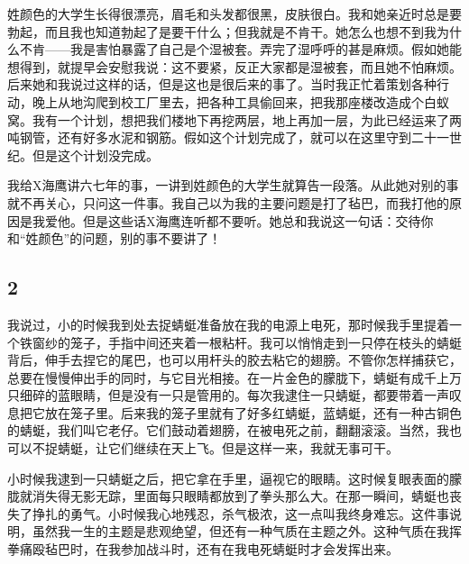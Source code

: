 姓颜色的大学生长得很漂亮，眉毛和头发都很黑，皮肤很白。我和她亲近时总是要勃起，而且我也知道勃起了是要干什么；但我就是不肯干。她怎么也想不到我为什么不肯——我是害怕暴露了自己是个湿被套。弄完了湿呼呼的甚是麻烦。假如她能想得到，就提早会安慰我说：这不要紧，反正大家都是湿被套，而且她不怕麻烦。后来她和我说过这样的话，但是这也是很后来的事了。当时我正忙着策划各种行动，晚上从地沟爬到校工厂里去，把各种工具偷回来，把我那座楼改造成个白蚁窝。我有一个计划，想把我们楼地下再挖两层，地上再加一层，为此已经运来了两吨钢管，还有好多水泥和钢筋。假如这个计划完成了，就可以在这里守到二十一世纪。但是这个计划没完成。 

我给X海鹰讲六七年的事，一讲到姓颜色的大学生就算告一段落。从此她对别的事就不再关心，只问这一件事。我自己以为我的主要问题是打了毡巴，而我打他的原因是我爱他。但是这些话X海鹰连听都不要听。她总和我说这一句话：交待你和“姓颜色”的问题，别的事不要讲了！ 

\subsection{2} 

我说过，小的时候我到处去捉蜻蜓准备放在我的电源上电死，那时候我手里提着一个铁窗纱的笼子，手指中间还夹着一根粘杆。我可以悄悄走到一只停在枝头的蜻蜓背后，伸手去捏它的尾巴，也可以用杆头的胶去粘它的翅膀。不管你怎样捕获它，总要在慢慢伸出手的同时，与它目光相接。在一片金色的朦胧下，蜻蜓有成千上万只细碎的蓝眼睛，但是没有一只是管用的。每次我逮住一只蜻蜓，都要带着一声叹息把它放在笼子里。后来我的笼子里就有了好多红蜻蜓，蓝蜻蜓，还有一种古铜色的蜻蜓，我们叫它老仔。它们鼓动着翅膀，在被电死之前，翻翻滚滚。当然，我也可以不捉蜻蜓，让它们继续在天上飞。但是这样一来，我就无事可干。 

小时候我逮到一只蜻蜓之后，把它拿在手里，逼视它的眼睛。这时候复眼表面的朦胧就消失得无影无踪，里面每只眼睛都放到了拳头那么大。在那一瞬间，蜻蜓也丧失了挣扎的勇气。小时候我心地残忍，杀气极浓，这一点叫我终身难忘。这件事说明，虽然我一生的主题是悲观绝望，但还有一种气质在主题之外。这种气质在我挥拳痛殴毡巴时，在我参加战斗时，还有在我电死蜻蜓时才会发挥出来。 

